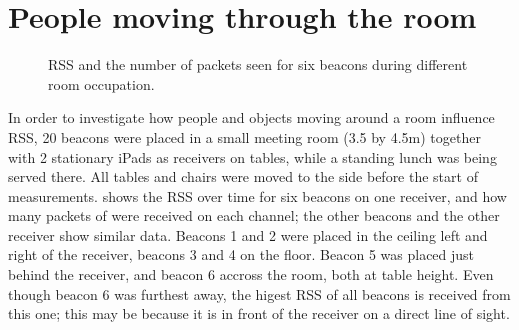 \section{People moving through the room}
\label{sec:rss-busyroom}
\begin{figure}[p]
    \begin{subfigure}[b]{0.5\textwidth}
    \end{subfigure}
    \begin{subfigure}[b]{0.5\textwidth}
    \end{subfigure}
    \begin{subfigure}[b]{0.5\textwidth}
    \end{subfigure}
    \begin{subfigure}[b]{0.5\textwidth}
    \end{subfigure}
    \begin{subfigure}[b]{0.5\textwidth}
    \end{subfigure}
    \begin{subfigure}[b]{0.5\textwidth}
    \end{subfigure}
    \caption{RSS and the number of packets seen for six beacons during different room occupation.}
    \label{fig:rss-busyroom}
\end{figure}

In order to investigate how people and objects moving around a room influence RSS, 20 beacons were placed in a small meeting room (3.5 by 4.5m) together with 2 stationary iPads as receivers on tables, while a standing lunch was being served there.
All tables and chairs were moved to the side before the start of measurements.
 shows the RSS over time for six beacons on one receiver, and how many packets of were received on each channel; the other beacons and the other receiver show similar data.
Beacons 1 and 2 were placed in the ceiling left and right of the receiver, beacons 3 and 4 on the floor.
Beacon 5 was placed just behind the receiver, and beacon 6 accross the room, both at table height.
Even though beacon 6 was furthest away, the higest RSS of all beacons is received from this one; this may be because it is in front of the receiver on a direct line of sight.


